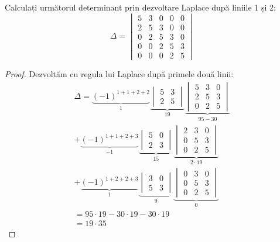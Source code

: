 \begin{exercise}[180]
Calculați următorul determinant prin dezvoltare Laplace după liniile 1 și 2:
\[
\Delta = \begin{vmatrix}
5 & 3 & 0 & 0 & 0 \\
2 & 5 & 3 & 0 & 0 \\
0 & 2 & 5 & 3 & 0 \\
0 & 0 & 2 & 5 & 3 \\
0 & 0 & 0 & 2 & 5
\end{vmatrix}
\]
\end{exercise}
\begin{proof}
Dezvoltăm cu regula lui Laplace după primele două linii:
\begin{gather*}
    \Delta = \underbrace{(-1)^{1 + 1 + 2 + 2}}_{1} \underbrace{\begin{vmatrix}
        5 & 3 \\
        2 & 5
    \end{vmatrix}}_{19} \underbrace{\begin{vmatrix}
        5 & 3 & 0 \\
        2 & 5 & 3 \\
        0 & 2 & 5
    \end{vmatrix}}_{95 - 30} \\
    + \underbrace{(-1)^{1 + 1 + 2 + 3}}_{-1} \underbrace{\begin{vmatrix}
        5 & 0 \\
        2 & 3
    \end{vmatrix}}_{15} \underbrace{\begin{vmatrix}
        2 & 3 & 0 \\
        0 & 5 & 3 \\
        0 & 2 & 5
    \end{vmatrix}}_{2 \cdot 19} \\
    + \underbrace{(-1)^{1 + 2 + 2 + 3}}_{1} \underbrace{\begin{vmatrix}
        3 & 0 \\
        5 & 3
    \end{vmatrix}}_{9} \underbrace{\begin{vmatrix}
        0 & 3 & 0 \\
        0 & 5 & 3 \\
        0 & 2 & 5
    \end{vmatrix}}_{0} \\
    = 95 \cdot 19 - 30 \cdot 19 - 30 \cdot 19 \\
    = 19 \cdot 35
\end{gather*}
\end{proof}

